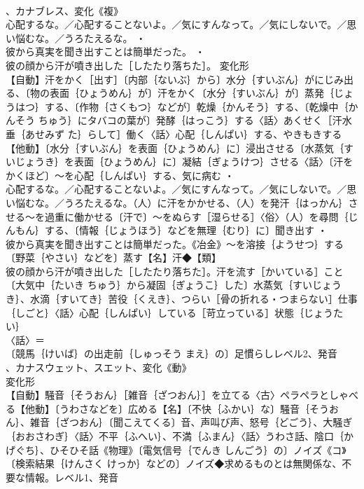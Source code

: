 \documentclass[8pt]{extreport}
\begin{document}
\begin{CJK}{UTF8}{min}
\\	、カナブレス、変化《複》
\\	心配するな。／心配することないよ。／気にすんなって。／気にしないで。／思い悩むな。／うろたえるな。 ・
\\	彼から真実を聞き出すことは簡単だった。 ・
\\	彼の顔から汗が噴き出した［したたり落ちた］。	変化形 
\\	【自動】汗をかく［出す］〔内部｛ないぶ｝から〕水分｛すいぶん｝がにじみ出る、〔物の表面｛ひょうめん｝が〕汗をかく〔水分｛すいぶん｝が〕蒸発｛じょうはつ｝する、〔作物｛さくもつ｝などが〕乾燥｛かんそう｝する、〔乾燥中｛かんそう ちゅう｝にタバコの葉が〕発酵｛はっこう｝する〈話〉あくせく［汗水垂｛あせみず た｝らして］働く〈話〉心配｛しんぱい｝する、やきもきする【他動】〔水分｛すいぶん｝を表面｛ひょうめん｝に〕浸出させる〔水蒸気｛すいじょうき｝を表面｛ひょうめん｝に〕凝結｛ぎょうけつ｝させる〈話〉〔汗をかくほど〕～を心配｛しんぱい｝する、気に病む ・
\\	心配するな。／心配することないよ。／気にすんなって。／気にしないで。／思い悩むな。／うろたえるな。（人）に汗をかかせる、（人）を発汗｛はっかん｝させる～を過重に働かせる〔汗で〕～をぬらす［湿らせる］〈俗〉（人）を尋問｛じんもん｝する、〔情報｛じょうほう｝などを無理｛むり｝に〕聞き出す ・
\\	彼から真実を聞き出すことは簡単だった。《冶金》～を溶接｛ようせつ｝する〔野菜｛やさい｝などを〕蒸す【名】汗◆【類】
\\	彼の顔から汗が噴き出した［したたり落ちた］。汗を流す［かいている］こと〔大気中｛たいき ちゅう｝から凝固｛ぎょうこ｝した〕水蒸気｛すいじょうき｝、水滴｛すいてき｝苦役｛くえき｝、つらい［骨の折れる・つまらない］仕事｛しごと｝〈話〉心配｛しんぱい｝している［苛立っている］状態｛じょうたい｝
\\	〈話〉＝
\\	〔競馬｛けいば｝の出走前｛しゅっそう まえ｝の〕足慣らしレベル2、発音
\\	、カナスウェット、スエット、変化《動》
\\	変化形 
\\	【自動】騒音｛そうおん｝［雑音｛ざつおん｝］を立てる〈古〉ペラペラとしゃべる【他動】〔うわさなどを〕広める【名】〔不快｛ふかい｝な〕騒音｛そうおん｝、雑音｛ざつおん｝〔聞こえてくる〕音、声叫び声、怒号｛どごう｝、大騒ぎ｛おおさわぎ｝〈話〉不平｛ふへい｝、不満｛ふまん｝〈話〉うわさ話、陰口｛かげぐち｝、ひそひそ話《物理》〔電気信号｛でんき しんごう｝の〕ノイズ《コ》〔検索結果｛けんさく けっか｝などの〕ノイズ◆求めるものとは無関係な、不要な情報。レベル1、発音

\end{CJK}
\end{document}
